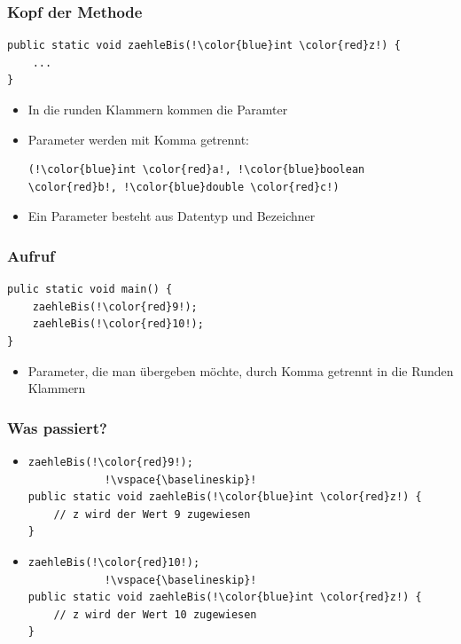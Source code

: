 \documentclass[final]{beamer}
\begin{document}
\begin{frame}[containsverbatim]
	\frametitle{Kopf der Methode}
	\begin{lstlisting}[escapechar=!]
public static void zaehleBis(!\color{blue}int \color{red}z!) {
	...
}
	\end{lstlisting}
	\begin{itemize}
		\item{In die runden Klammern kommen die Paramter}
		\item{Parameter werden mit Komma getrennt:
			\begin{lstlisting}[escapechar=!]
(!\color{blue}int \color{red}a!, !\color{blue}boolean \color{red}b!, !\color{blue}double \color{red}c!)
			\end{lstlisting}
		}
		\item{Ein Parameter besteht aus {\color{blue}Datentyp} und \color{red}Bezeichner}
	\end{itemize}
\end{frame}

\begin{frame}[containsverbatim]
	\frametitle{Aufruf}
	\begin{lstlisting}[escapechar=!]
pulic static void main() {
	zaehleBis(!\color{red}9!);
	zaehleBis(!\color{red}10!);
}
	\end{lstlisting}
	\begin{itemize}
		\item{Parameter, die man übergeben möchte, durch Komma getrennt in die Runden Klammern}
	\end{itemize}
\end{frame}

\begin{frame}[containsverbatim]
	\frametitle{Was passiert?}
	\begin{itemize}
		\item{
			\begin{lstlisting}[escapechar=!]
zaehleBis(!\color{red}9!);
			!\vspace{\baselineskip}!
public static void zaehleBis(!\color{blue}int \color{red}z!) {
	// z wird der Wert 9 zugewiesen
}
			\end{lstlisting}
		}
		\vspace{\baselineskip}
		\item{
			\begin{lstlisting}[escapechar=!]
zaehleBis(!\color{red}10!);
			!\vspace{\baselineskip}!
public static void zaehleBis(!\color{blue}int \color{red}z!) {
	// z wird der Wert 10 zugewiesen
}
			\end{lstlisting}
		}
	\end{itemize}
\end{frame}
\end{document}
